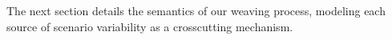 The next section details the semantics of our
weaving process, modeling each source of scenario variability as a crosscutting 
mechanism.


% 
% 
% 
% 
% 




